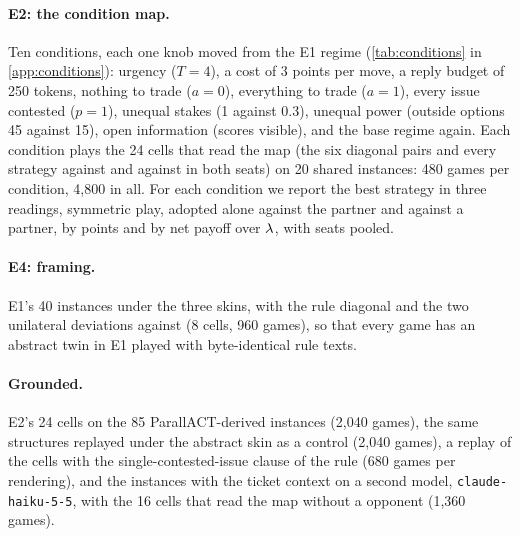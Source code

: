 \paragraph{E2: the condition map.} Ten conditions, each one knob moved from the E1 regime (\cref{tab:conditions} in \cref{app:conditions}): urgency ($T{=}4$), a cost of 3 points per move, a reply budget of 250 tokens, nothing to trade ($a{=}0$), everything to trade ($a{=}1$), every issue contested ($p{=}1$), unequal stakes (1 against 0.3), unequal power (outside options 45 against 15), open information (scores visible), and the base regime again. Each condition plays the 24 cells that read the map (the six diagonal pairs and every strategy against \neutral{} and against \competing{} in both seats) on 20 shared instances: 480 games per condition, 4{,}800 in all. For each condition we report the best strategy in three readings, symmetric play, adopted alone against the \neutral{} partner and against a \competing{} partner, by points and by net payoff over $\lambda$, with seats pooled.

\paragraph{E4: framing.} E1's 40 instances under the three skins, with the rule diagonal and the two unilateral deviations against \neutral{} (8 cells, 960 games), so that every game has an abstract twin in E1 played with byte-identical rule texts.

\paragraph{Grounded.} E2's 24 cells on the 85 ParallACT-derived instances (2{,}040 games), the same structures replayed under the abstract skin as a control (2{,}040 games), a replay of the \collaborating{} cells with the single-contested-issue clause of the rule (680 games per rendering), and the instances with the ticket context on a second model, \texttt{claude-haiku-5-5}, with the 16 cells that read the map without a \competing{} opponent (1{,}360 games).

